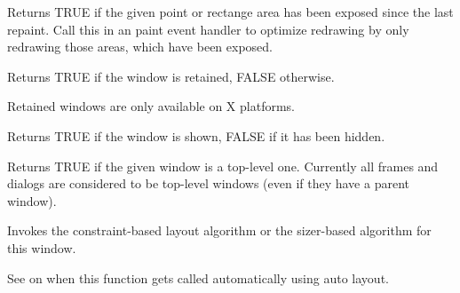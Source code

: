 


Returns TRUE if the given point or rectange area has been exposed since the
last repaint. Call this in an paint event handler to optimize redrawing by
only redrawing those areas, which have been exposed.


\label{wxwindowisretained}


Returns TRUE if the window is retained, FALSE otherwise.


Retained windows are only available on X platforms.

\label{wxwindowisshown}


Returns TRUE if the window is shown, FALSE if it has been hidden.

\label{wxwindowistoplevel}


Returns TRUE if the given window is a top-level one. Currently all frames and
dialogs are considered to be top-level windows (even if they have a parent
window).

\label{wxwindowlayout}


Invokes the constraint-based layout algorithm or the sizer-based algorithm
for this window.

See  on when
this function gets called automatically using auto layout.

\label{wxwindowloadfromresource}

